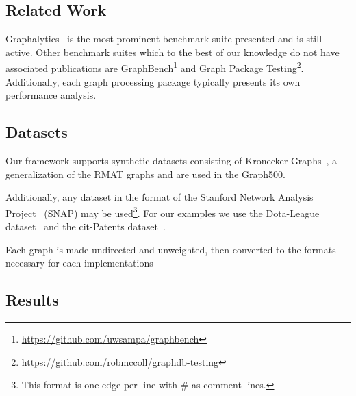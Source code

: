 \documentclass[conference]{IEEEtran}
\begin{document}
\subsection{Related Work}\label{sec:relatedwork}
Graphalytics~\cite{Capota:2015:Graphalytics} is the most prominent benchmark suite presented and is still active. Other benchmark suites which to the best of our knowledge do not have associated publications are GraphBench\footnote{\url{https://github.com/uwsampa/graphbench}} and Graph Package Testing\footnote{\url{ https://github.com/robmccoll/graphdb-testing}}. Additionally, each graph processing package typically presents its own performance analysis.

\subsection{Datasets}
Our framework supports synthetic datasets consisting of Kronecker Graphs~\cite{Leskovec:2010:Kronecker}, a generalization of the RMAT graphs and are used in the Graph500.

Additionally, any dataset in the format of the Stanford Network Analysis Project~\cite{snapnets} (SNAP) may be used\footnote{This format is one edge per line with \# as comment lines.}. For our examples we use the Dota-League dataset~\cite{Guo:2012:GTA} and the cit-Patents dataset~\cite{snap-cit-patents}.

Each graph is made undirected and unweighted, then converted to the formats necessary for each implementations

\subsection{Results}
\end{document}
